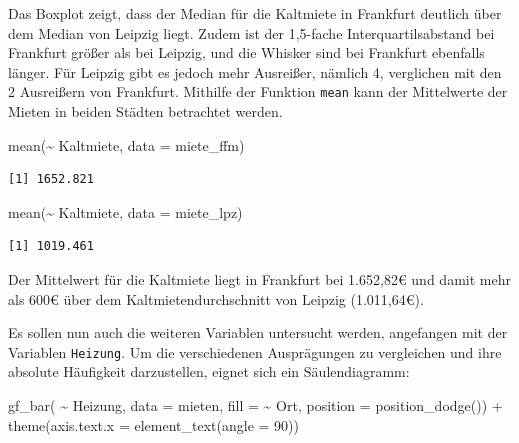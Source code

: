 \documentclass[
  a4paper,
  DIV=11]{scrartcl}
\newenvironment{Shaded}{\begin{snugshade}}{\end{snugshade}}
\newcommand{\AttributeTok}[1]{\textcolor[rgb]{0.40,0.45,0.13}{#1}}
\newcommand{\DecValTok}[1]{\textcolor[rgb]{0.68,0.00,0.00}{#1}}
\newcommand{\FunctionTok}[1]{\textcolor[rgb]{0.28,0.35,0.67}{#1}}
\newcommand{\NormalTok}[1]{\textcolor[rgb]{0.00,0.23,0.31}{#1}}
\newcommand{\SpecialCharTok}[1]{\textcolor[rgb]{0.37,0.37,0.37}{#1}}
\begin{document}
Das Boxplot zeigt, dass der Median für die Kaltmiete in Frankfurt
deutlich über dem Median von Leipzig liegt. Zudem ist der 1,5-fache
Interquartilsabstand bei Frankfurt größer als bei Leipzig, und die
Whisker sind bei Frankfurt ebenfalls länger. Für Leipzig gibt es jedoch
mehr Ausreißer, nämlich 4, verglichen mit den 2 Ausreißern von
Frankfurt. Mithilfe der Funktion \texttt{mean} kann der Mittelwerte der
Mieten in beiden Städten betrachtet werden.

\begin{Shaded}
\begin{Highlighting}[]
\FunctionTok{mean}\NormalTok{(}\SpecialCharTok{\textasciitilde{}}\NormalTok{ Kaltmiete, }\AttributeTok{data =}\NormalTok{ miete\_ffm)}
\end{Highlighting}
\end{Shaded}

\begin{verbatim}
[1] 1652.821
\end{verbatim}

\begin{Shaded}
\begin{Highlighting}[]
\FunctionTok{mean}\NormalTok{(}\SpecialCharTok{\textasciitilde{}}\NormalTok{ Kaltmiete, }\AttributeTok{data =}\NormalTok{ miete\_lpz)}
\end{Highlighting}
\end{Shaded}

\begin{verbatim}
[1] 1019.461
\end{verbatim}

Der Mittelwert für die Kaltmiete liegt in Frankfurt bei 1.652,82€ und
damit mehr als 600€ über dem Kaltmietendurchschnitt von Leipzig
(1.011,64€).

Es sollen nun auch die weiteren Variablen untersucht werden, angefangen
mit der Variablen \texttt{Heizung}. Um die verschiedenen Ausprägungen zu
vergleichen und ihre absolute Häufigkeit darzustellen, eignet sich ein
Säulendiagramm:

\begin{Shaded}
\begin{Highlighting}[]
\FunctionTok{gf\_bar}\NormalTok{( }\SpecialCharTok{\textasciitilde{}}\NormalTok{ Heizung, }\AttributeTok{data =}\NormalTok{ mieten, }\AttributeTok{fill =} \SpecialCharTok{\textasciitilde{}}\NormalTok{ Ort, }\AttributeTok{position =} \FunctionTok{position\_dodge}\NormalTok{()) }\SpecialCharTok{+} \FunctionTok{theme}\NormalTok{(}\AttributeTok{axis.text.x =} \FunctionTok{element\_text}\NormalTok{(}\AttributeTok{angle =} \DecValTok{90}\NormalTok{))}
\end{Highlighting}
\end{Shaded}
\end{document}
